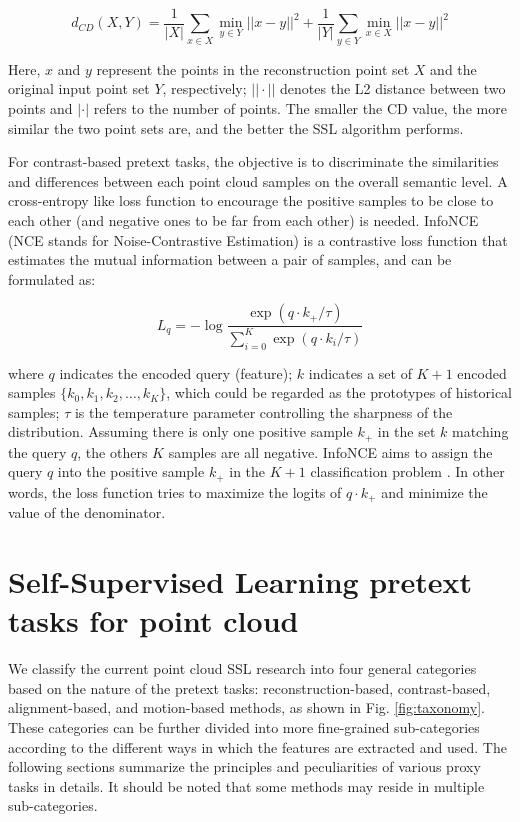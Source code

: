 \documentclass[a4paper,fleqn]{cas-dc}
\begin{document}
\begin{equation}
    d_{CD}(X,Y) = \frac{1}{|X|} \sum_{x \in X} \min_{y \in Y} ||x-y||^2 + \frac{1}{|Y|} \sum_{y \in Y} \min_{x \in X} ||x-y||^2
\end{equation}

Here, $x$ and $y$ represent the points in the reconstruction point set $X$ and the original input point set $Y$, respectively; $|| \cdot ||$ denotes the L2 distance between two points and $| \cdot |$ refers to the number of points. The smaller the CD value, the more similar the two point sets are, and the better the SSL algorithm performs.

For contrast-based pretext tasks, the objective is to discriminate the similarities and differences between each point cloud samples on the overall semantic level. A cross-entropy like loss function to encourage the positive samples to be close to each other (and negative ones to be far from each other) is needed. InfoNCE (NCE stands for Noise-Contrastive Estimation) is a contrastive loss function that estimates the mutual information between a pair of samples, and can be formulated as:

\begin{equation}
    L_q = - \log \frac{\exp(q \cdot k_+ / \tau)}{\sum_{i=0}^K \exp(q \cdot k_i / \tau)}
\end{equation}

where $q$ indicates the encoded query (feature); $k$ indicates a set of $K+1$ encoded samples $\{ k_0, k_1, k_2, \dots, k_K \}$, which could be regarded as the prototypes of historical samples; $\tau$ is the temperature parameter controlling the sharpness of the distribution. Assuming there is only one positive sample $k_+$ in the set $k$ matching the query $q$, the others $K$ samples are all negative. InfoNCE aims to assign the query $q$ into the positive sample $k_+$ in the $K+1$ classification problem \citep{he2020momentum}. In other words, the loss function tries to maximize the logits of $q \cdot k_+$ and minimize the value of the denominator. 


\section{Self-Supervised Learning pretext tasks for point cloud}\label{sec:pretext}
We classify the current point cloud SSL research into four general categories based on the nature of the pretext tasks: reconstruction-based, contrast-based, alignment-based, and motion-based methods, as shown in Fig. \ref{fig:taxonomy}. These categories can be further divided into more fine-grained sub-categories according to the different ways in which the features are extracted and used. The following sections summarize the principles and peculiarities of various proxy tasks in details. It should be noted that some methods may reside in multiple sub-categories.
\end{document}
